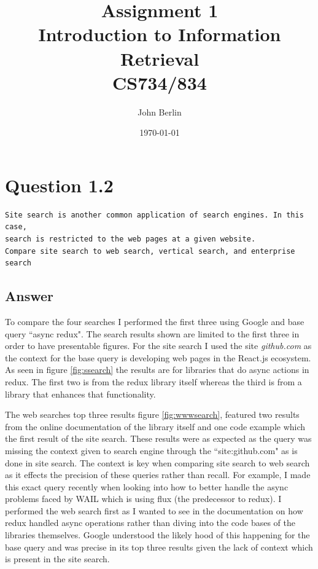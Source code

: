 \documentclass[a4paper,11pt]{article}
\title{Assignment 1 \\ Introduction to Information Retrieval \\ CS734/834}
\author{John Berlin}
\date{\today}
\begin{document}
\maketitle
\newpage
\section{Question 1.2}
\begin{verbatim}
Site search is another common application of search engines. In this case,
search is restricted to the web pages at a given website. 
Compare site search to web search, vertical search, and enterprise search
\end{verbatim}
\subsection{Answer}
To compare the four searches I performed the first three using Google and base query ``async redux". 
The search results shown are limited to the first three in order to have presentable figures.
For the site search I used the site \textit{github.com} as the context for the base query is developing web pages in the React.js ecosystem.
As seen in figure \hyperref[fig:ssearch]{\ref{fig:ssearch}} the results are for libraries that do async actions in redux. The first two is from the redux library itself whereas the third is from a library that enhances that functionality.  \newline

The web searches top three results figure \hyperref[fig:wwwearch]{\ref{fig:wwwsearch}}, featured two results from the online documentation of the library itself and one code example which the first result of the site search.  These results were as expected as the query was missing the context given to search engine through the ``site:github.com" as is done in site search. The context is key when comparing site search to web search as it effects the precision of these queries rather than recall. For example, I made this exact query recently when looking into how to better handle the async problems faced by WAIL\footnotemark {} which is using flux (the predecessor to redux). I performed the web search first as I wanted to see in the documentation on how redux handled async operations rather than diving into the code bases of the libraries themselves. Google understood the likely hood of this happening for the base query and was precise in its top three results given the lack of context which is present in the site search.
\newline 
\end{document}
